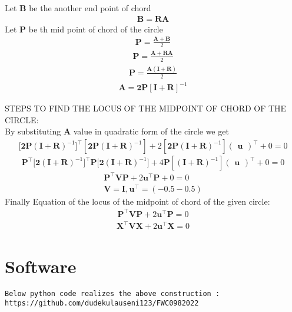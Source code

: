 \documentclass[10pt, a4paper]{article}
\newcommand{\myvec}[1]{\ensuremath{\begin{pmatrix}#1\end{pmatrix}}}
\let\vec\mathbf
\begin{document}
Let $\vec{B}$ be the another end point of chord \\\vspace{1mm}
\begin{align}
    \vec{B} = \vec{RA}
\end{align}
Let $\vec{P}$ be th mid point of chord of the circle
\begin{align}
    \vec{P} = \frac{\vec{A+B}}{2}
\end{align}
\begin{align}
     \vec{P} = \frac{\vec{A+RA}}{2}
\end{align}
\begin{align}
     \vec{P} = \frac{\vec{A(I+R)}}{2}
\end{align}
\begin{align}
     \vec{A} =\vec{\vec{2P[I+R]}}^{-1}
\end{align}

STEPS TO FIND THE LOCUS OF THE MIDPOINT OF CHORD OF THE CIRCLE:\\
By substituting $\vec{A}$ value in quadratic form of the circle we get
\begin{align}
\vec{[2P(I+R)}^{-1}]^{\top}[\vec{2P(I+R)}^{-1}]+2[\vec{2P(I+R)}^{-1}]\myvec{\vec{u}}^{\top}+0=0
\end{align}
$$\vec{P}^{\top}\vec{[2(I+R)}^{-1}]^{\top}\vec{P}\vec{[2(I+R)}^{-1}]+4\vec{P}[\vec{(I+R)}^{-1}]\myvec{\vec{u}}^{\top}+0=0$$
\begin{align}
\vec{P}^{\top}\vec{V}\vec{P}+2\vec{u}^{\top}\vec{P}+0=0\\
 \vec{V}=\vec{I} ,\vec{u}^{\top}=(-0.5 -0.5)
\end{align}
Finally  Equation of the locus of the midpoint  of  chord of the given circle:
\begin{align}
\vec{P}^{\top}\vec{V}\vec{P}+2\vec{u}^{\top}\vec{P}=0
\end{align}
\begin{align}
\vec{X}^{\top}\vec{V}\vec{X}+2\vec{u}^{\top}\vec{X}=0
\end{align}

\section{Software}
\begin{center}
 \begin{lstlisting}
Below python code realizes the above construction :
https://github.com/dudekulauseni123/FWC0982022
 \end{lstlisting}
\end{center}
\end{document}

